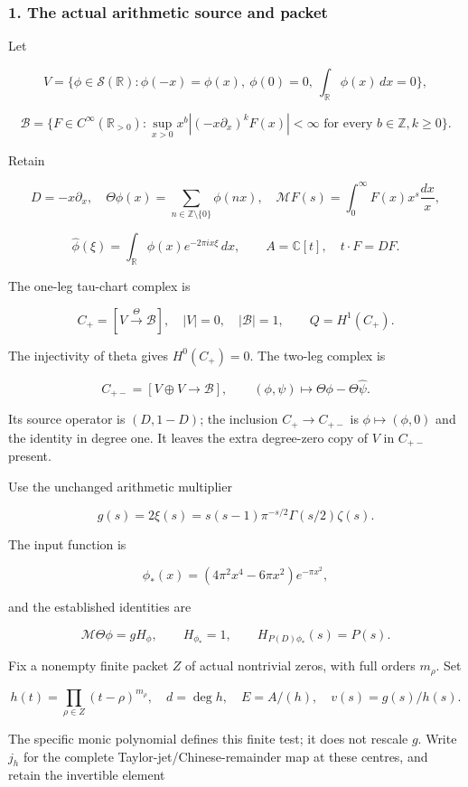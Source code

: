 \subsubsection{1. The actual arithmetic source and
packet}\label{pr_9:the-actual-arithmetic-source-and-packet}

Let

\[V=\{\phi\in\mathcal S(\mathbb R):\phi(-x)=\phi(x),\ \phi(0)=0,\ \int_{\mathbb R}\phi(x)\,dx=0\},\]

\[\mathscr B=\{F\in C^\infty(\mathbb R_{>0}):
\sup_{x>0}x^b|(-x\partial_x)^kF(x)|<\infty\text{ for every }b\in\mathbb Z,k\ge0\}.\]

Retain

\[D=-x\partial_x,\quad \Theta\phi(x)=\sum_{n\in\mathbb Z\setminus\{0\}}\phi(nx),\quad
\mathcal MF(s)=\int_0^\infty F(x)x^s\frac{dx}{x},\]

\[\widehat\phi(\xi)=\int_{\mathbb R}\phi(x)e^{-2\pi i x\xi}\,dx,\qquad
A=\mathbb C[t],\quad t\cdot F=DF.\]

The one-leg tau-chart complex is

\[C_+=[V\xrightarrow{\Theta}\mathscr B],\quad |V|=0,\quad |\mathscr B|=1,\qquad Q=H^1(C_+).\]

The injectivity of theta gives \(H^0(C_+)=0\). The two-leg complex is

\[C_{+-}=[V\oplus V\longrightarrow\mathscr B],\qquad
(\phi,\psi)\longmapsto\Theta\phi-\Theta\widehat\psi.\]

Its source operator is \((D,1-D)\); the inclusion \(C_+\to C_{+-}\) is \(\phi\mapsto(\phi,0)\) and
the identity in degree one. It leaves the extra degree-zero copy of \(V\) in \(C_{+-}\) present.

Use the unchanged arithmetic multiplier

\[g(s)=2\xi(s)=s(s-1)\pi^{-s/2}\Gamma(s/2)\zeta(s).\]

The input function is

\[\phi_*(x)=(4\pi^2x^4-6\pi x^2)e^{-\pi x^2},\]

and the established identities are

\[\mathcal M\Theta\phi=gH_\phi,\qquad H_{\phi_*}=1,\qquad
H_{P(D)\phi_*}(s)=P(s).\]

Fix a nonempty finite packet \(Z\) of actual nontrivial zeros, with full orders \(m_\rho\). Set

\[h(t)=\prod_{\rho\in Z}(t-\rho)^{m_\rho},\quad d=\deg h,\quad E=A/(h),\quad v(s)=g(s)/h(s).\]

The specific monic polynomial defines this finite test; it does not rescale \(g\). Write \(j_h\) for
the complete Taylor-jet/Chinese-remainder map at these centres, and retain the invertible element


